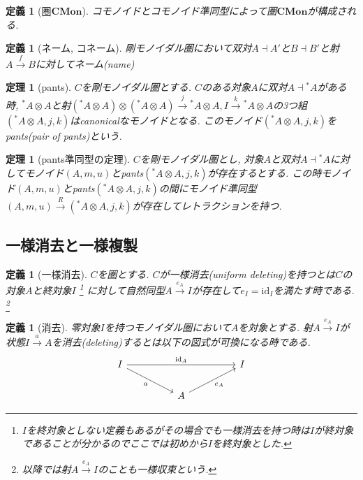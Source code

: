 \documentclass[a4paper,12pt]{ltjsarticle}
\theoremstyle{break}
\newtheorem{defn}[thm]{定義}
\newtheorem{thrm}[thm]{定理}
\newcommand{\cmon}{\mathbf{CMon}}
\newcommand{\xr}[1]{\xrightarrow{#1}}
\newcommand{\id}{\mathrm{id}}
\newcommand{\dav}{\dashv}
\newcommand{\ot}{\otimes}
\numberwithin{equation}{section}
\begin{document}
\begin{defn}[圏$\cmon$]
  コモノイドとコモノイド準同型によって圏$\cmon$が構成される. 
\end{defn}

\begin{defn}[ネーム, コネーム]%
  剛モノイダル圏において双対$A \dav A'$と$B \dav B'$と射$A \xr{f} B$に対してネーム(name)
\end{defn}

\begin{thrm}[pants]
  $C$を剛モノイダル圏とする. 
  $C$のある対象$A$に双対$A \dav {}^*A$がある時, ${}^*A \ot A$と射$({}^*A \ot A) \ot ({}^*A \ot A) \xr{j} {}^*A \ot A, I \xr{k} {}^*A \ot A$の3つ組$({}^*A \ot A,j,k)$はcanonicalなモノイドとなる. 
  このモノイド$({}^*A \ot A,j,k)$をpants(pair of pants)という. 
\end{thrm}

\begin{thrm}[pants準同型の定理]
  $C$を剛モノイダル圏とし, 対象$A$と双対$A \dav {}^*A$に対してモノイド$(A,m,u)$とpants$({}^*A \ot A,j,k)$が存在するとする. 
  この時モノイド$(A,m,u)$とpants$({}^*A \ot A,j,k)$の間にモノイド準同型$(A,m,u) \xr{R} ({}^*A \ot A,j,k)$が存在してレトラクションを持つ. 
\end{thrm}

\subsection{一様消去と一様複製}

\begin{defn}[一様消去]
  $C$を圏とする.
  $C$が一様消去(uniform deleting)を持つとは$C$の対象$A$と終対象$I$
  \footnote{
    $I$を終対象としない定義もあるがその場合でも一様消去を持つ時は$I$が終対象であることが分かるのでここでは初めから$I$を終対象とした. 
  }
  に対して自然同型$A \xr{e_A} I$が存在して$e_I=\id_I$を満たす時である.
  \footnote{
    以降では射$A \xr{e_A} I$のことも一様収束という.
  }
\end{defn}


\begin{defn}[消去]
  零対象$I$を持つモノイダル圏において$A$を対象とする. 
  射$A \xr{e_A} I$が状態$I \xr{a} A$を消去(deleting)するとは以下の図式が可換になる時である. 
  \[\begin{tikzcd}
    I &&&& I \\
    && A
    \arrow["{\id_A}", from=1-1, to=1-5]
    \arrow["a"', from=1-1, to=2-3]
    \arrow["{e_A}"', from=2-3, to=1-5]
  \end{tikzcd}\]
\end{defn}
\end{document}
